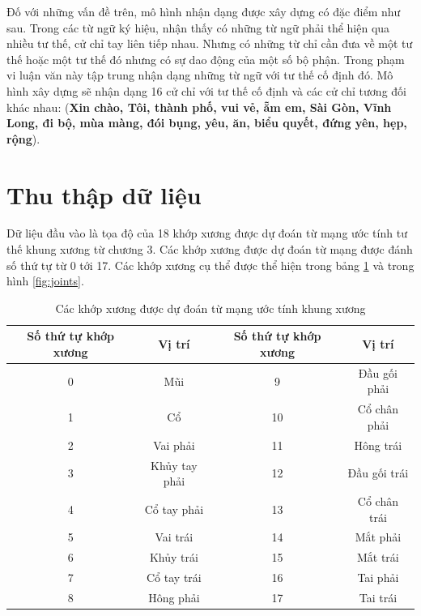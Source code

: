 Đố với những vấn đề trên, mô hình nhận dạng được xây dựng có đặc điểm như sau. Trong các từ ngữ ký hiệu, nhận thấy có những từ ngữ phải thể hiện qua nhiều tư thế, cử chỉ tay liên tiếp nhau. Nhưng có những từ chỉ cần đưa về một tư thế hoặc một tư thế đó nhưng có sự dao động của một số bộ phận. Trong phạm vi luận văn này tập trung nhận dạng những từ ngữ với tư thế cố định đó. Mô hình xây dựng sẽ nhận dạng 16 cử chỉ với tư thế cố định và các cử chỉ tương đối khác nhau: (\textbf{Xin chào, Tôi, thành phố, vui vẻ, ẵm em, Sài Gòn, Vĩnh Long, đi bộ, mùa màng, đói bụng, yêu, ăn, biểu quyết, đứng yên, hẹp, rộng}).

\section{Thu thập dữ liệu}
Dữ liệu đầu vào là tọa độ của 18 khớp xương được dự đoán từ mạng ước tính tư thế khung xương từ chương 3. Các khớp xương được dự đoán từ mạng được đánh số thứ tự từ 0 tới 17. Các khớp xương cụ thể được thể hiện trong bảng \ref{table:joints} và trong hình \ref{fig:joints}.


\begin{table}[h]
\caption{Các khớp xương được dự đoán từ mạng ước tính khung xương}
\label{table:joints}
\centering
\begin{center}
\begin{tabular}{|c|c||c|c|} 
 \hline
Số thứ tự khớp xương  & Vị trí & Số thứ tự khớp xương & Vị trí\\
 \hline
 0 & Mũi & 9 & Đầu gối phải\\
 \hline 
 1 & Cổ & 10 & Cổ chân phải\\
 \hline 
 2 & Vai phải & 11 & Hông trái\\
 \hline
 3 & Khủy tay phải & 12 & Đầu gối trái \\
 \hline 
 4 & Cổ tay phải & 13 & Cổ chân trái \\
 \hline
 5 & Vai trái & 14 & Mắt phải \\
 \hline
 6 & Khủy trái & 15 & Mắt trái \\
 \hline
 7 & Cổ tay trái & 16 & Tai phải \\
 \hline
 8 & Hông phải & 17 & Tai trái\\
 \hline
\end{tabular}
\end{center}
\end{table}

